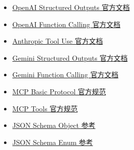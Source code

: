 \documentclass[10pt,a4paper]{ctexart}
\begin{document}
\begin{itemize}[itemsep=2pt, topsep=4pt]
  \item \href{https://platform.openai.com/docs/guides/structured-outputs}{OpenAI Structured Outputs 官方文档}
  \item \href{https://platform.openai.com/docs/guides/function-calling}{OpenAI Function Calling 官方文档}
  \item \href{https://platform.claude.com/docs/en/agents-and-tools/tool-use/overview}{Anthropic Tool Use 官方文档}
  \item \href{https://ai.google.dev/gemini-api/docs/structured-output}{Gemini Structured Outputs 官方文档}
  \item \href{https://ai.google.dev/gemini-api/docs/function-calling}{Gemini Function Calling 官方文档}
  \item \href{https://modelcontextprotocol.io/specification/2025-06-18/basic}{MCP Basic Protocol 官方规范}
  \item \href{https://modelcontextprotocol.io/specification/2025-06-18/server/tools}{MCP Tools 官方规范}
  \item \href{https://json-schema.org/understanding-json-schema/reference/object}{JSON Schema Object 参考}
  \item \href{https://json-schema.org/understanding-json-schema/reference/enum}{JSON Schema Enum 参考}
\end{itemize}
\end{document}
